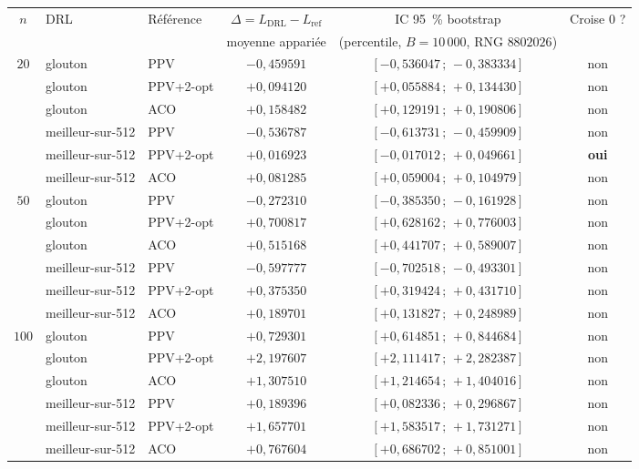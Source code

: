 \documentclass[12pt, a4paper, twoside, openright]{book}
\begin{document}
\begin{table}[H]
\centering
\scriptsize
\begin{tabular}{cllccc}
\toprule
$n$ & DRL & Référence & $\Delta = L_{\text{DRL}}-L_{\text{ref}}$ & IC 95~\% bootstrap & Croise $0$ ? \\
 & & & moyenne appariée & (percentile, $B{=}10\,000$, RNG $8802026$) & \\
\midrule
\multirow{6}{*}{$20$}
 & glouton & PPV & $-0{,}459591$ & $[-0{,}536047\,;\,-0{,}383334]$ & non \\
 & glouton & PPV+2-opt & $+0{,}094120$ & $[+0{,}055884\,;\,+0{,}134430]$ & non \\
 & glouton & ACO & $+0{,}158482$ & $[+0{,}129191\,;\,+0{,}190806]$ & non \\
 & meilleur-sur-512 & PPV & $-0{,}536787$ & $[-0{,}613731\,;\,-0{,}459909]$ & non \\
 & meilleur-sur-512 & PPV+2-opt & $+0{,}016923$ & $[-0{,}017012\,;\,+0{,}049661]$ & \textbf{oui} \\
 & meilleur-sur-512 & ACO & $+0{,}081285$ & $[+0{,}059004\,;\,+0{,}104979]$ & non \\
\midrule
\multirow{6}{*}{$50$}
 & glouton & PPV & $-0{,}272310$ & $[-0{,}385350\,;\,-0{,}161928]$ & non \\
 & glouton & PPV+2-opt & $+0{,}700817$ & $[+0{,}628162\,;\,+0{,}776003]$ & non \\
 & glouton & ACO & $+0{,}515168$ & $[+0{,}441707\,;\,+0{,}589007]$ & non \\
 & meilleur-sur-512 & PPV & $-0{,}597777$ & $[-0{,}702518\,;\,-0{,}493301]$ & non \\
 & meilleur-sur-512 & PPV+2-opt & $+0{,}375350$ & $[+0{,}319424\,;\,+0{,}431710]$ & non \\
 & meilleur-sur-512 & ACO & $+0{,}189701$ & $[+0{,}131827\,;\,+0{,}248989]$ & non \\
\midrule
\multirow{6}{*}{$100$}
 & glouton & PPV & $+0{,}729301$ & $[+0{,}614851\,;\,+0{,}844684]$ & non \\
 & glouton & PPV+2-opt & $+2{,}197607$ & $[+2{,}111417\,;\,+2{,}282387]$ & non \\
 & glouton & ACO & $+1{,}307510$ & $[+1{,}214654\,;\,+1{,}404016]$ & non \\
 & meilleur-sur-512 & PPV & $+0{,}189396$ & $[+0{,}082336\,;\,+0{,}296867]$ & non \\
 & meilleur-sur-512 & PPV+2-opt & $+1{,}657701$ & $[+1{,}583517\,;\,+1{,}731271]$ & non \\
 & meilleur-sur-512 & ACO & $+0{,}767604$ & $[+0{,}686702\,;\,+0{,}851001]$ & non \\

\end{tabular}
\end{table}
\end{document}
